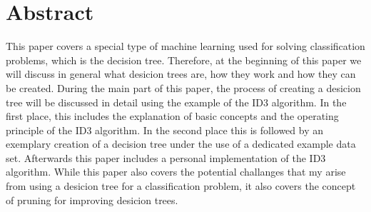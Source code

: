 \chapter{Abstract}
\label{abstract}

This paper covers a special type of machine learning used for solving classification problems, which is the decision tree. Therefore, at the beginning of this paper we will discuss in general what desicion trees are, how they work and how they can be created. During the main part of this paper, the process of creating a desicion tree will be discussed in detail using the example of the ID3 algorithm. In the first place, this includes the explanation of basic concepts and the operating principle of the ID3 algorithm. In the second place this is followed by an exemplary creation of a decision tree under the use of a dedicated example data set. Afterwards this paper includes a personal implementation of the ID3 algorithm. While this paper also covers the potential challanges that my arise from using a desicion tree for a classification problem, it also covers the concept of pruning for improving desicion trees.